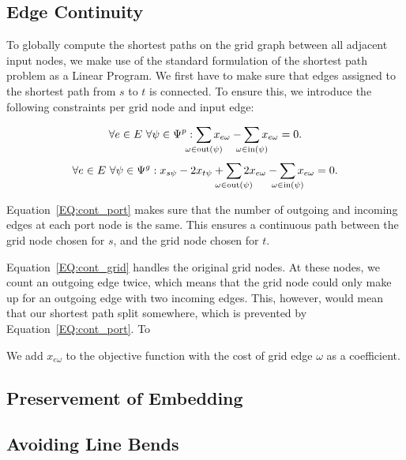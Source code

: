 \documentclass{sig-alternate-sigmod09}
\begin{document}
\subsection{Edge Continuity}

To globally compute the shortest paths on the grid graph between all adjacent input nodes, we make use of the standard formulation of the shortest path problem as a Linear Program.
We first have to make sure that edges assigned to the shortest path from $s$ to $t$ is connected.
To ensure this, we introduce the following constraints per grid node and input edge:

\newcommand\Psum[1]{\sum_{\makebox[0pt]{$\scriptstyle#1$}}}

\begin{equation}
  \forall e \in E\ \forall \psi \in \Psi^p: \Psum{\omega \in \text{out}(\psi)} x_{e\omega} - \Psum{\omega \in \text{in}(\psi)} x_{e\omega} = 0. \label{EQ:cont_port}
\end{equation}
\begin{equation}
	\begin{split}
  	\forall e \in E\ \forall \psi \in \Psi^g: x_{s\psi} - 2x_{t\psi} + \Psum{\omega \in \text{out}(\psi)} 2x_{e\omega} - \Psum{\omega \in \text{in}(\psi)} x_{e\omega} = 0. \label{EQ:cont_grid}
  \end{split}
\end{equation}

Equation~\ref{EQ:cont_port} makes sure that the number of outgoing and incoming edges at each port node is the same.
This ensures a continuous path between the grid node chosen for $s$, and the grid node chosen for $t$.

Equation~\ref{EQ:cont_grid} handles the original grid nodes.
At these nodes, we count an outgoing edge twice, which means that the grid node could only make up for an outgoing edge with two incoming edges.
This, however, would mean that our shortest path split somewhere, which is prevented by Equation~\ref{EQ:cont_port}.
To 




We add $x_{e\omega}$ to the objective function with the cost of grid edge $\omega$ as a coefficient.



\subsection{Preservement of Embedding}

\subsection{Avoiding Line Bends}
\end{document}
